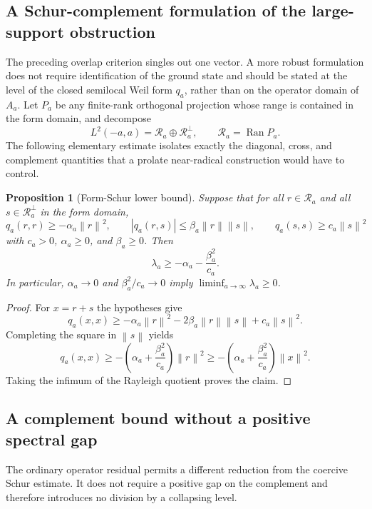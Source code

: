 \documentclass[11pt]{article}
\newtheorem{proposition}[theorem]{Proposition}
\theoremstyle{remark}
\newcommand{\norm}[1]{\left\lVert #1\right\rVert}
\begin{document}
\subsection*{A Schur-complement formulation of the large-support obstruction}
The preceding overlap criterion singles out one vector.  A more robust formulation does not require identification of the ground state and should be stated at the level of the closed semilocal Weil form $q_a$, rather than on the operator domain of $A_a$.  Let $P_a$ be any finite-rank orthogonal projection whose range is contained in the form domain, and decompose
\[
 L^2(-a,a)=\mathcal R_a\oplus\mathcal R_a^\perp,
 \qquad \mathcal R_a=\operatorname{Ran}P_a.
\]
The following elementary estimate isolates exactly the diagonal, cross, and complement quantities that a prolate near-radical construction would have to control.

\begin{proposition}[Form-Schur lower bound]\label{prop:g2-schur}
Suppose that for all $r\in\mathcal R_a$ and all $s\in\mathcal R_a^\perp$ in the form domain,
\[
 q_a(r,r)\ge-\alpha_a\norm r^2,
 \qquad
 |q_a(r,s)|\le\beta_a\norm r\norm s,
 \qquad
 q_a(s,s)\ge c_a\norm s^2
\]
with $c_a>0$, $\alpha_a\ge0$, and $\beta_a\ge0$. Then
\[
 \boxed{
 \lambda_a\ge -\alpha_a-\frac{\beta_a^2}{c_a}.
 }
 \tag{G2.4}
\]
In particular, $\alpha_a\to0$ and $\beta_a^2/c_a\to0$ imply $\liminf_{a\to\infty}\lambda_a\ge0$.
\end{proposition}
\begin{proof}
For $x=r+s$ the hypotheses give
\[
 q_a(x,x)
 \ge -\alpha_a\norm r^2-2\beta_a\norm r\norm s+c_a\norm s^2.
\]
Completing the square in $\norm s$ yields
\[
 q_a(x,x)
 \ge -\left(\alpha_a+\frac{\beta_a^2}{c_a}\right)\norm r^2
 \ge -\left(\alpha_a+\frac{\beta_a^2}{c_a}\right)\norm x^2.
\]
Taking the infimum of the Rayleigh quotient proves the claim.
\end{proof}

\subsection*{A complement bound without a positive spectral gap}
The ordinary operator residual permits a different reduction from the
coercive Schur estimate.  It does not require a positive gap on the
complement and therefore introduces no division by a collapsing level.
\end{document}
